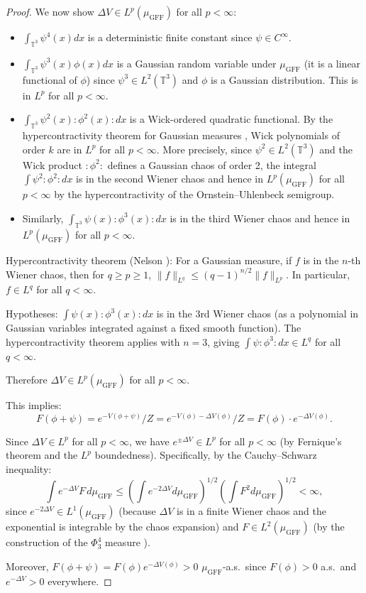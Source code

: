 \documentclass[12pt]{article}
\begin{document}
\begin{proof}
We now show $\Delta V \in L^p(\mu_{\mathrm{GFF}})$ for all $p < \infty$:
\begin{itemize}
\item $\int_{\mathbb{T}^3} \psi^4(x) dx$ is a deterministic finite constant since $\psi \in C^\infty$.
\item $\int_{\mathbb{T}^3} \psi^3(x) \phi(x) dx$ is a Gaussian random variable under $\mu_{\mathrm{GFF}}$ (it is a linear functional of $\phi$) since $\psi^3 \in L^2(\mathbb{T}^3)$ and $\phi$ is a Gaussian distribution. This is in $L^p$ for all $p < \infty$.
\item $\int_{\mathbb{T}^3} \psi^2(x):\!\phi^2(x)\!: dx$ is a Wick-ordered quadratic functional. By the hypercontractivity theorem for Gaussian measures \cite[Theorem 2.2]{Simon}, Wick polynomials of order $k$ are in $L^p$ for all $p < \infty$. More precisely, since $\psi^2 \in L^2(\mathbb{T}^3)$ and the Wick product $:\!\phi^2\!:$ defines a Gaussian chaos of order 2, the integral $\int \psi^2:\!\phi^2\!: dx$ is in the second Wiener chaos and hence in $L^p(\mu_{\mathrm{GFF}})$ for all $p < \infty$ by the hypercontractivity of the Ornstein--Uhlenbeck semigroup.
\item Similarly, $\int_{\mathbb{T}^3} \psi(x):\!\phi^3(x)\!: dx$ is in the third Wiener chaos and hence in $L^p(\mu_{\mathrm{GFF}})$ for all $p < \infty$.
\end{itemize}

Hypercontractivity theorem (Nelson \cite{Nelson1973}): For a Gaussian measure, if $f$ is in the $n$-th Wiener chaos, then for $q \geq p \geq 1$, $\|f\|_{L^q} \leq (q-1)^{n/2}\|f\|_{L^p}$. In particular, $f \in L^q$ for all $q < \infty$.

Hypotheses: $\int \psi(x):\!\phi^3(x)\!: dx$ is in the 3rd Wiener chaos (as a polynomial in Gaussian variables integrated against a fixed smooth function). The hypercontractivity theorem applies with $n = 3$, giving $\int \psi:\!\phi^3\!: dx \in L^q$ for all $q < \infty$.

Therefore $\Delta V \in L^p(\mu_{\mathrm{GFF}})$ for all $p < \infty$.

This implies:
\[
F(\phi + \psi) = e^{-V(\phi+\psi)}/Z = e^{-V(\phi) - \Delta V(\phi)}/Z = F(\phi) \cdot e^{-\Delta V(\phi)}.
\]

Since $\Delta V \in L^p$ for all $p < \infty$, we have $e^{\pm \Delta V} \in L^p$ for all $p < \infty$ (by Fernique's theorem and the $L^p$ boundedness). Specifically, by the Cauchy--Schwarz inequality:
\[
\int e^{-\Delta V} F \, d\mu_{\mathrm{GFF}} \leq \left(\int e^{-2\Delta V} d\mu_{\mathrm{GFF}}\right)^{1/2} \left(\int F^2 d\mu_{\mathrm{GFF}}\right)^{1/2} < \infty,
\]
since $e^{-2\Delta V} \in L^1(\mu_{\mathrm{GFF}})$ (because $\Delta V$ is in a finite Wiener chaos and the exponential is integrable by the chaos expansion) and $F \in L^2(\mu_{\mathrm{GFF}})$ (by the construction of the $\Phi^4_3$ measure \cite{BG2020}).

Moreover, $F(\phi+\psi) = F(\phi)e^{-\Delta V(\phi)} > 0$ $\mu_{\mathrm{GFF}}$-a.s.\ since $F(\phi) > 0$ a.s.\ and $e^{-\Delta V} > 0$ everywhere.
\end{proof}
\end{document}
